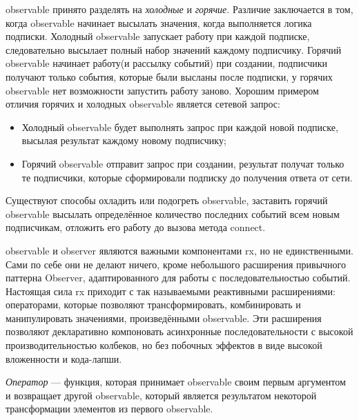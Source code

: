 \gls{observable} принято разделять на \emph{холодные} и \emph{горячие}. Различие заключается в том, когда \gls{observable} начинает высылать значения, когда выполняется логика подписки. Холодный \gls{observable} запускает работу при каждой подписке, следовательно высылает полный набор значений каждому подписчику. Горячий \gls{observable} начинает работу(и рассылку событий) при создании, подписчики получают только события, которые были высланы после подписки, у горячих \gls{observable} нет возможности запустить работу заново. Хорошим примером отличия горячих и холодных \gls{observable} является сетевой запрос:

\begin{itemize}
	\item Холодный \gls{observable} будет выполнять запрос при каждой новой подписке, высылая результат каждому новому подписчику;
	\item Горячий \gls{observable} отправит запрос при создании, результат получат только те подписчики, которые сформировали подписку до получения ответа от сети.
\end{itemize}

Существуют способы охладить или подогреть \gls{observable}, заставить горячий \gls{observable} высылать определённое количество последних событий всем новым подписчикам, отложить его работу до вызова метода connect.

\gls{observable} и observer являются важными компонентами \gls{rx}, но не единственными. Сами по себе они не делают ничего, кроме небольшого расширения привычного паттерна Observer, адаптированного для работы с последовательностью событий. Настоящая сила \gls{rx} приходит с так называемыми реактивными расширениями: операторами, которые позволяют трансформировать, комбинировать и манипулировать значениями, произведёнными \gls{observable}. Эти расширения позволяют декларативно компоновать асинхронные последовательности с высокой производительностью колбеков, но без побочных эффектов в виде высокой вложенности и кода-лапши.

\emph{Оператор} --- функция, которая принимает \gls{observable} своим первым аргументом и возвращает другой \gls{observable}, который является результатом некоторой трансформации элементов из первого \gls{observable}.
